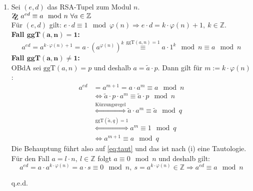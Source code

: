 \documentclass[DIN, pagenumber=false, fontsize=11pt, parskip=half]{scrartcl}
\newcommand{\Z}[0]{\mathbb{Z}}
\newcommand{\ZZ}{\mathrm{Z\kern-.3em\raise-0.5ex\hbox{Z}}}
\newcommand{\ggt}{\text{ggT}}
\newcommand{\congTo}[3][]{\stackrel{#1}{\equiv} #2\mod #3}
\newcommand{\Qed}{\begin{flushright}
    q.e.d.
\end{flushright}}
\begin{document}
\begin{enumerate}[label=(\roman*)]
        \item Sei $(e, d)$ das RSA-Tupel zum Modul $n$. \\ $\ZZ \ a^{ed} \congTo{a}{n} \ \forall a \in \Z$ \\
              Für $(e, d)$ gilt: $e \cdot d \congTo{1}{\varphi(n)} \Rightarrow e \cdot d = k \cdot \varphi(n) + 1, \ k \in \Z$. \\
              \textbf{Fall $\mathbf{\ggt(a, n) = 1}$:}
              \begin{equation}
                  a^{ed} = a^{k \cdot \varphi(n) + 1} = a \cdot \left(a^{\varphi(n)}\right)^k \congTo[\ggt(a, n) = 1]{a \cdot 1^k}{n} \congTo{a}{n}
              \end{equation}
              \textbf{Fall $\mathbf{\ggt(a, n) \neq 1}$:} \\
              OBdA sei $\ggt(a, n) = p$ und deshalb $a = \tilde{a} \cdot p$. Dann gilt für $m := k \cdot \varphi(n)$:
              \begin{align}
                  a^{ed} &= a^{m + 1} = a \cdot a^m \congTo{a}{n} \\
                  &\Leftrightarrow \tilde{a} \cdot p \cdot a^m \congTo{\tilde{a} \cdot p}{n} \\
                  &\stackrel{\text{Kürzungsregel}}{\Leftrightarrow} \tilde{a} \cdot a^m \congTo{\tilde{a}}{q} \\
                  &\stackrel{\ggt(\tilde{a}, q) = 1}{\Leftrightarrow} a^m \congTo{1}{q} \\
                  &\Leftrightarrow a^{m + 1} \congTo{a}{q} \label{eq:taut}
              \end{align}
              Die Behauptung führt also auf \cref{eq:taut} und das ist nach (i) eine Tautologie. Für den Fall $a = l \cdot n, \ l \in \Z$ folgt
              $a \congTo{0}{n}$ und deshalb gilt:
              \begin{equation}
                  a^{ed} = a \cdot a^{k \cdot \varphi(n)} = a \cdot s \congTo{0}{n}, \ s = a^{k \cdot \varphi(n)} \in \Z \Rightarrow a^{ed} \congTo{a}{n}
              \end{equation}
              \Qed
    \end{enumerate}
\end{document}
